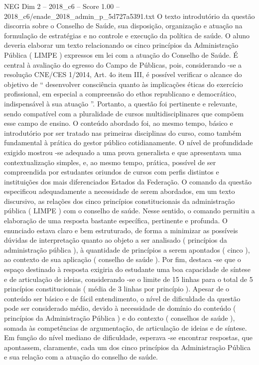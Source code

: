 \begin{textsample}{NEG Dim 2 – 2018\_c6 – Score 1.00 – 2018\_c6/enade\_2018\_admin\_p\_5d727a5391.txt}
O texto introdutório da questão discorria sobre o Conselho de Saúde, sua disposição, organização e atuação na formulação de estratégias e no controle e execução da política de saúde.
O aluno deveria elaborar um texto relacionando os cinco princípios da Administração Pública ( LIMPE ) expressos em lei com a atuação do Conselho de Saúde.
É central à avaliação do egresso do Campo de Públicas, pois, considerando -se a resolução CNE/CES 1/2014, Art. 4o item III, é possível verificar o alcance do objetivo de “ desenvolver consciência quanto às implicações éticas do exercício profissional, em especial a compreensão do ethos republicano e democrático, indispensável à sua atuação ”.
Portanto, a questão foi pertinente e relevante, sendo compatível com a pluralidade de cursos multidisciplinares que compõem esse campo de ensino.
O conteúdo abordado foi, ao mesmo tempo, básico e introdutório por ser tratado nas primeiras disciplinas do curso, como também fundamental à prática do gestor público cotidianamente.
O nível de profundidade exigido mostrou -se adequado a uma prova generalista e que apresentava uma contextualização simples, e, ao mesmo tempo, prática, possível de ser compreendida por estudantes oriundos de cursos com perfis distintos e instituições dos mais diferenciados Estados da Federação.
O comando da questão especificou adequadamente a necessidade de serem abordados, em um texto discursivo, as relações dos cinco princípios constitucionais da administração pública ( LIMPE ) com o conselho de saúde.
Nesse sentido, o comando permitiu a elaboração de uma resposta bastante específica, pertinente e profunda.
O enunciado estava claro e bem estruturado, de forma a minimizar as possíveis dúvidas de interpretação quanto ao objeto a ser analisado ( princípios da administração pública ), à quantidade de princípios a serem apontados ( cinco ), ao contexto de sua aplicação ( conselho de saúde ).
Por fim, destaca -se que o espaço destinado à resposta exigiria do estudante uma boa capacidade de síntese e de articulação de ideias, considerando -se o limite de 15 linhas para o total de 5 princípios constitucionais ( média de 3 linhas por princípio ).
Apesar de o conteúdo ser básico e de fácil entendimento, o nível de dificuldade da questão pode ser considerado médio, devido à necessidade de domínio do conteúdo ( princípios da Administração Pública ) e do contexto ( conselhos de saúde ), somada às competências de argumentação, de articulação de ideias e de síntese.
Em função do nível mediano de dificuldade, esperava -se encontrar respostas, que apontassem, claramente, cada um dos cinco princípios da Administração Pública e sua relação com a atuação do conselho de saúde.

\end{textsample}
